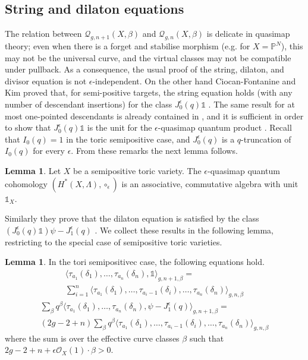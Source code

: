 \documentclass[11pt]{amsart}
\newcommand{\Q}[4]{\mathcal{Q}_{#1,#2}(#3,#4)}
\newcommand{\PP}{\mathbb P}
\newcommand{\OO}{\mathcal{O}}
\theoremstyle{definition}
\newtheorem{lemma}[thm]{Lemma}
\theoremstyle{definition}
\begin{document}
\subsection{String and dilaton equations}
 The relation between $\Q{g}{n+1}{X}{\beta}$ and $\Q{g}{n}{X}{\beta}$ is delicate in quasimap theory; even when there is a forget and stabilise morphism (e.g. for $X=\PP^N$), this may not be the universal curve, and the virtual classes may not be compatible under pullback. As a consequence, the usual proof of the string, dilaton, and divisor equation is not $\epsilon$-independent. On the other hand Ciocan-Fontanine and Kim proved that, for semi-positive targets, the string equation holds (with any number of descendant insertions) for the class $J_0^\epsilon(q)\mathds{1}$ \cite[Proposition 3.4.1]{CF-K-higher-genus}. The same result for at most one-pointed descendants is already contained in \cite[Corollary 5.5.4]{CF-K-wallcrossing}, and it is sufficient in order to show that $J_0^\epsilon(q)\mathds{1}$ is the unit for the $\epsilon$-quasimap quantum product \cite[Remark 3.1.4]{CF-K-higher-genus}. Recall that $I_0(q)=1$ in the toric semipositive case, and $J_0^\epsilon(q)$ is a $q$-truncation of $I_0(q)$ for every $\epsilon$. From these remarks the next lemma follows.

 \begin{lemma}
 Let $X$ be a semipositive toric variety. The $\epsilon$-quasimap quantum cohomology $(H^*(X,\Lambda),\circ_\epsilon)$ is an associative, commutative algebra with unit $\mathds 1_X$.
 \end{lemma}
 
 Similarly they prove that the dilaton equation is satisfied by the class $(J_0^\epsilon(q)\mathds{1})\psi-J_1^\epsilon(q)$ \cite[Lemma 3.4.3]{CF-K-higher-genus}. We collect these results in the following lemma, restricting to the special case of semipositive toric varieties.
 \begin{lemma}
  In the tori semipositivec case, the following equations hold.
  \begin{multline}\tag{string}
   \langle \tau_{a_1}(\delta_1),\ldots,\tau_{a_n}(\delta_n), \mathds{1}\rangle_{g,n+1,\beta}= \\
   \sum_{i=1}^n\langle \tau_{a_1}(\delta_1),\ldots,\tau_{a_i-1}(\delta_i),\ldots,\tau_{a_n}(\delta_n)\rangle_{g,n,\beta}
  \end{multline}
 \begin{multline}\tag{dilaton}
  \sum_{\beta}q^\beta\langle \tau_{a_1}(\delta_1),\ldots,\tau_{a_n}(\delta_n), \psi-J^\epsilon_1(q)\rangle_{g,n+1,\beta}= \\
  (2g-2+n)\sum_{\beta}q^\beta\langle \tau_{a_1}(\delta_1),\ldots,\tau_{a_i-1}(\delta_i),\ldots,\tau_{a_n}(\delta_n) \rangle_{g,n,\beta}
 \end{multline}
where the sum is over the effective curve classes $\beta$ such that $2g-2+n+\epsilon\OO_X(1)\cdot\beta>0$.
 \end{lemma}
\end{document}
